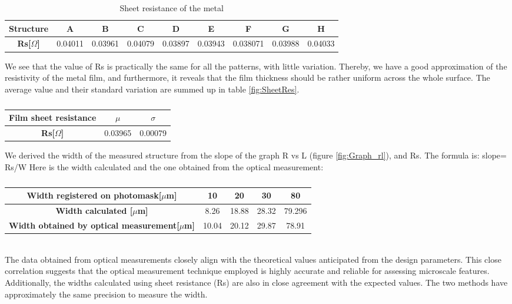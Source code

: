 \begin{table}[h!]
    \centering
    \caption{Sheet resistance of the metal}
    \begin{tabular}{|c|c|c|c|c|c|c|c|c|}
        \hline
        \textbf{Structure} & \textbf{A} & \textbf{B} & \textbf{C} & \textbf{D} & \textbf{E} & \textbf{F} & \textbf{G} & \textbf{H} \\ \hline
        \textbf{Rs[$\Omega$]} & 0.04011 & 0.03961 & 0.04079 & 0.03897 & 0.03943 & 0.038071 & 0.03988 & 0.04033 \\ \hline
    \end{tabular}
\end{table}
We see that the value of Rs is practically the same for all the patterns, with little variation. Thereby, we have a good approximation of the resistivity of the metal film, and furthermore, it reveals that the film thickness should be rather uniform across the whole surface.
The average value and their standard variation are summed up in table \ref{fig:SheetRes}.

\begin{table}[h!]
    \centering
    \caption{}
    \label{fig:SheetRes}
    \begin{tabular}{|c|c|c|}
        \hline
        \textbf{Film sheet resistance} & \textbf{$\mu$} & \textbf{$\sigma$} \\ \hline
        \textbf{Rs[$\Omega$]} & 0.03965 & 0.00079 \\ \hline
    \end{tabular}
    \label{mean1}
\end{table}
\pagebreak
We derived the width of the measured structure from the slope of the graph R vs L (figure \ref{fig:Graph_rl}), and Rs. The formula is: slope= Rs/W
Here is the width calculated and the one obtained from the optical measurement: \\
\begin{table}[h!]
    \centering
    \caption{}
    \begin{tabular}{|c|c|c|c|c|}
        \hline
        \textbf{Width registered on photomask[$\mu$m]} & \textbf{10} & \textbf{20} & \textbf{30} & \textbf{80}\\ \hline
        \textbf{Width calculated [$\mu$m]} & 8.26 & 18.88 & 28.32 & 79.296 \\ \hline
        \textbf{Width obtained by optical measurement[$\mu$m]} & 10.04 & 20.12 & 29.87 & 78.91\\ \hline
    \end{tabular}
    \label{mean2}
\end{table} 
\\
The data obtained from optical measurements closely align with the theoretical values anticipated from the design parameters. This close correlation suggests that the optical measurement technique employed is highly accurate and reliable for assessing microscale features. Additionally, the widths calculated using sheet resistance (Rs) are also in close agreement with the expected values. The two methods have approximately the same precision to measure the width.

